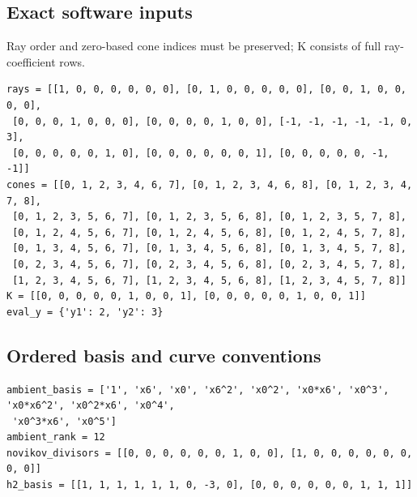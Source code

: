 \documentclass[10pt,a4paper]{article}
\begin{document}
\subsection*{Exact software inputs}
Ray order and zero-based cone indices must be preserved; K consists of full ray-coefficient rows.
\begin{lstlisting}
rays = [[1, 0, 0, 0, 0, 0, 0], [0, 1, 0, 0, 0, 0, 0], [0, 0, 1, 0, 0, 0, 0],
 [0, 0, 0, 1, 0, 0, 0], [0, 0, 0, 0, 1, 0, 0], [-1, -1, -1, -1, -1, 0, 3],
 [0, 0, 0, 0, 0, 1, 0], [0, 0, 0, 0, 0, 0, 1], [0, 0, 0, 0, 0, -1, -1]]
cones = [[0, 1, 2, 3, 4, 6, 7], [0, 1, 2, 3, 4, 6, 8], [0, 1, 2, 3, 4, 7, 8],
 [0, 1, 2, 3, 5, 6, 7], [0, 1, 2, 3, 5, 6, 8], [0, 1, 2, 3, 5, 7, 8],
 [0, 1, 2, 4, 5, 6, 7], [0, 1, 2, 4, 5, 6, 8], [0, 1, 2, 4, 5, 7, 8],
 [0, 1, 3, 4, 5, 6, 7], [0, 1, 3, 4, 5, 6, 8], [0, 1, 3, 4, 5, 7, 8],
 [0, 2, 3, 4, 5, 6, 7], [0, 2, 3, 4, 5, 6, 8], [0, 2, 3, 4, 5, 7, 8],
 [1, 2, 3, 4, 5, 6, 7], [1, 2, 3, 4, 5, 6, 8], [1, 2, 3, 4, 5, 7, 8]]
K = [[0, 0, 0, 0, 0, 1, 0, 0, 1], [0, 0, 0, 0, 0, 1, 0, 0, 1]]
eval_y = {'y1': 2, 'y2': 3}
\end{lstlisting}
\subsection*{Ordered basis and curve conventions}
\begin{lstlisting}
ambient_basis = ['1', 'x6', 'x0', 'x6^2', 'x0^2', 'x0*x6', 'x0^3', 'x0*x6^2', 'x0^2*x6', 'x0^4',
 'x0^3*x6', 'x0^5']
ambient_rank = 12
novikov_divisors = [[0, 0, 0, 0, 0, 0, 1, 0, 0], [1, 0, 0, 0, 0, 0, 0, 0, 0]]
h2_basis = [[1, 1, 1, 1, 1, 1, 0, -3, 0], [0, 0, 0, 0, 0, 0, 1, 1, 1]]
\end{lstlisting}
\end{document}
